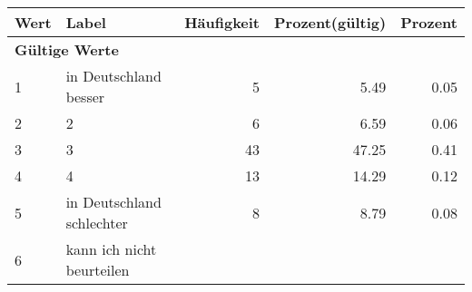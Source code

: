      \begin{longtable}{lXrrr}
     \toprule
     \textbf{Wert} & \textbf{Label} & \textbf{Häufigkeit} & \textbf{Prozent(gültig)} & \textbf{Prozent} \\
     \endhead
     \midrule
     \multicolumn{5}{l}{\textbf{Gültige Werte}}\\

     1 &
     \multicolumn{1}{X}{ in Deutschland besser   } &


       \num{5} &
       \num[round-mode=places,round-precision=2]{5.49} &
         \num[round-mode=places,round-precision=2]{0.05} \\

     2 &
     \multicolumn{1}{X}{ 2   } &


       \num{6} &
       \num[round-mode=places,round-precision=2]{6.59} &
         \num[round-mode=places,round-precision=2]{0.06} \\

     3 &
     \multicolumn{1}{X}{ 3   } &


       \num{43} &
       \num[round-mode=places,round-precision=2]{47.25} &
         \num[round-mode=places,round-precision=2]{0.41} \\

     4 &
     \multicolumn{1}{X}{ 4   } &


       \num{13} &
       \num[round-mode=places,round-precision=2]{14.29} &
         \num[round-mode=places,round-precision=2]{0.12} \\

     5 &
     \multicolumn{1}{X}{ in Deutschland schlechter   } &


       \num{8} &
       \num[round-mode=places,round-precision=2]{8.79} &
         \num[round-mode=places,round-precision=2]{0.08} \\

     6 &
     \multicolumn{1}{X}{ kann ich nicht beurteilen   } &



\end{longtable}

